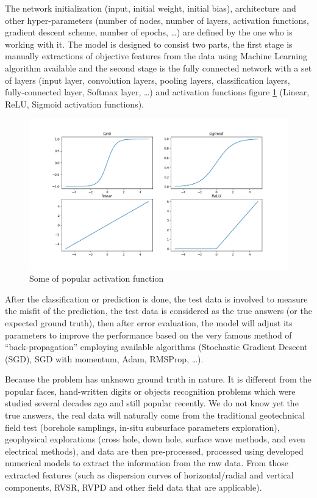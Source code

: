 The network initialization (input, initial weight, initial bias), architecture and other hyper-parameters (number of nodes, number of layers, activation functions, gradient descent scheme, number of epochs, …) are defined by the one who is working with it. The model is designed to consist two parts, the first stage is manually extractions of objective features from the data using Machine Learning algorithm available and the second stage is the fully connected network with a set of layers (input layer, convolution layers, pooling layers, classification layers, fully-connected layer, Softmax layer, …) and activation functions figure \ref{fig:activatefun} (Linear, ReLU, Sigmoid activation functions). 



\begin{figure}
    \centering
    \includegraphics[scale=0.3]{images/activatefun.png}
    \caption{Some of popular activation function}
    \label{fig:activatefun}
\end{figure}


After the classification or prediction is done, the test data is involved to measure the misfit of the prediction, the test data is considered as the true answers (or the expected ground truth), then after error evaluation, the model will adjust its parameters to improve the performance based on the very famous method of “back-propagation” employing available algorithms (Stochastic Gradient Descent (SGD), SGD with momentum, Adam, RMSProp, …).        

Because the problem has unknown ground truth in nature. It is different from the popular faces, hand-written digits or objects recognition problems which were studied several decades ago and still popular recently. We do not know yet the true answers, the real data will naturally come from the traditional geotechnical field test (borehole samplings, in-situ subsurface parameters exploration), geophysical explorations (cross hole, down hole, surface wave methods, and even electrical methods), and data are then pre-processed, processed using developed numerical models to extract the information from the raw data. From those extracted features (such as dispersion curves of horizontal/radial and vertical components, RVSR, RVPD and other field data that are applicable).

